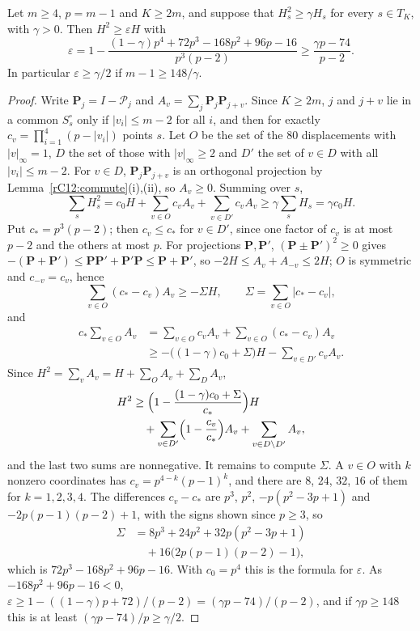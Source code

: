 \begin{lemma}\label{rC12:knabe}
Let $m\ge4$, $p=m-1$ and $K\ge2m$, and suppose that $H_s^2\ge\gamma H_s$
for every $s\in T_K$, with $\gamma>0$. Then $H^2\ge\varepsilon H$ with
\[
\varepsilon=1-\frac{(1-\gamma)p^4+72p^3-168p^2+96p-16}{p^3(p-2)}\ge
\frac{\gamma p-74}{p-2}.
\]
In particular $\varepsilon\ge\gamma/2$ if $m-1\ge148/\gamma$.
\end{lemma}

\begin{proof}
Write $\mathbf P_j=I-\mathcal P_j$ and $A_v=\sum_j\mathbf P_j\mathbf P_{j+v}$.
Since $K\ge2m$, $j$ and $j+v$ lie in a common $S^\circ_s$ only if $\lvert v_i
\rvert\le m-2$ for all $i$, and then for exactly $c_v=\prod_{i=1}^4(p-\lvert
v_i\rvert)$ points $s$. Let $O$ be the set of the $80$ displacements with
$\lvert v\rvert_\infty=1$, $D$ the set of those with $\lvert v\rvert_\infty
\ge2$ and $D'$ the set of $v\in D$ with all $\lvert v_i\rvert\le m-2$. For
$v\in D$, $\mathbf P_j\mathbf P_{j+v}$ is an orthogonal projection by
Lemma~\ref{rC12:commute}(i),(ii), so $A_v\ge0$. Summing over $s$,
\[
\sum_sH_s^2=c_0H+\sum_{v\in O}c_vA_v+\sum_{v\in D'}c_vA_v\ge\gamma\sum_sH_s
=\gamma c_0H .
\]
Put $c_*=p^3(p-2)$; then $c_v\le c_*$ for $v\in D'$, since one factor of
$c_v$ is at most $p-2$ and the others at most $p$. For projections
$\mathbf P,\mathbf P'$, $(\mathbf P\pm\mathbf P')^2\ge0$ gives $-(\mathbf P+
\mathbf P')\le\mathbf P\mathbf P'+\mathbf P'\mathbf P\le\mathbf P+\mathbf
P'$, so $-2H\le A_v+A_{-v}\le2H$; $O$ is symmetric and $c_{-v}=c_v$, hence
\[
\sum_{v\in O}(c_*-c_v)A_v\ge-\Sigma H,\qquad\Sigma=\sum_{v\in O}\lvert c_*-
c_v\rvert,
\]
and
\[
\begin{split}
c_*\sum_{v\in O}A_v&=\sum_{v\in O}c_vA_v+\sum_{v\in O}(c_*-c_v)A_v\\
&\ge-\bigl((1-\gamma)c_0+\Sigma\bigr)H-\sum_{v\in D'}c_vA_v .
\end{split}
\]
Since $H^2=\sum_vA_v=H+\sum_{O}A_v+\sum_DA_v$,
\[
\begin{split}
H^2&\ge\Bigl(1-\frac{(1-\gamma)c_0+\Sigma}{c_*}\Bigr)H\\
&\quad+\sum_{v\in D'}\Bigl(1-\frac{c_v}{c_*}\Bigr)A_v+\sum_{v\in D
\setminus D'}A_v,
\end{split}
\]
and the last two sums are nonnegative. It remains to compute $\Sigma$. A
$v\in O$ with $k$ nonzero coordinates has $c_v=p^{4-k}(p-1)^k$, and there are
$8$, $24$, $32$, $16$ of them for $k=1,2,3,4$. The differences $c_v-c_*$ are
$p^3$, $p^2$, $-p(p^2-3p+1)$ and $-2p(p-1)(p-2)+1$, with the signs shown
since $p\ge3$, so
\[
\begin{split}
\Sigma&=8p^3+24p^2+32p(p^2-3p+1)\\
&\quad+16\bigl(2p(p-1)(p-2)-1\bigr),
\end{split}
\]
which is $72p^3-168p^2+96p-16$. With $c_0=p^4$ this is the formula for
$\varepsilon$. As $-168p^2+96p-16<0$, $\varepsilon\ge1-((1-\gamma)p+72)/(p-
2)=(\gamma p-74)/(p-2)$, and if $\gamma p\ge148$ this is at least $(\gamma
p-74)/p\ge\gamma/2$.
\end{proof}

